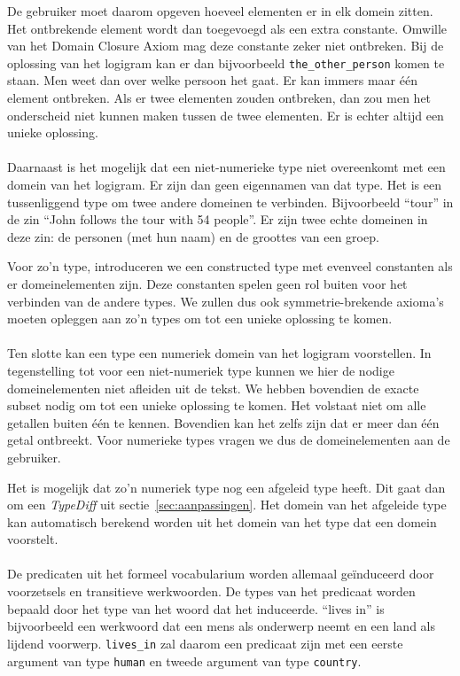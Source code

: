 De gebruiker moet daarom opgeven hoeveel elementen er in elk domein zitten. Het ontbrekende element wordt dan toegevoegd als een extra constante. Omwille van het Domain Closure Axiom mag deze constante zeker niet ontbreken. Bij de oplossing van het logigram kan er dan bijvoorbeeld \texttt{the\_other\_person} komen te staan. Men weet dan over welke persoon het gaat. Er kan immers maar één element ontbreken. Als er twee elementen zouden ontbreken, dan zou men het onderscheid niet kunnen maken tussen de twee elementen. Er is echter altijd een unieke oplossing.

\paragraph{} Daarnaast is het mogelijk dat een niet-numerieke type niet overeenkomt met een domein van het logigram. Er zijn dan geen eigennamen van dat type. Het is een tussenliggend type om twee andere domeinen te verbinden. Bijvoorbeeld ``tour'' in de zin ``John follows the tour with 54 people''. Er zijn twee echte domeinen in deze zin: de personen (met hun naam) en de groottes van een groep.

Voor zo'n type, introduceren we een constructed type met evenveel constanten als er domeinelementen zijn. Deze constanten spelen geen rol buiten voor het verbinden van de andere types. We zullen dus ook symmetrie-brekende axioma's moeten opleggen aan zo'n types om tot een unieke oplossing te komen.

\paragraph{} Ten slotte kan een type een numeriek domein van het logigram voorstellen. In tegenstelling tot voor een niet-numeriek type kunnen we hier de nodige domeinelementen niet afleiden uit de tekst. We hebben bovendien de exacte subset nodig om tot een unieke oplossing te komen. Het volstaat niet om alle getallen buiten één te kennen. Bovendien kan het zelfs zijn dat er meer dan één getal ontbreekt. Voor numerieke types vragen we dus de domeinelementen aan de gebruiker.

Het is mogelijk dat zo'n numeriek type nog een afgeleid type heeft. Dit gaat dan om een \textit{TypeDiff} uit sectie~\ref{sec:aanpassingen}. Het domein van het afgeleide type kan automatisch berekend worden uit het domein van het type dat een domein voorstelt.

\paragraph{} De predicaten uit het formeel vocabularium worden allemaal geïnduceerd door voorzetsels en transitieve werkwoorden. De types van het predicaat worden bepaald door het type van het woord dat het induceerde. ``lives in'' is bijvoorbeeld een werkwoord dat een mens als onderwerp neemt en een land als lijdend voorwerp. \texttt{lives\_in} zal daarom een predicaat zijn met een eerste argument van type \texttt{human} en tweede argument van type \texttt{country}.

